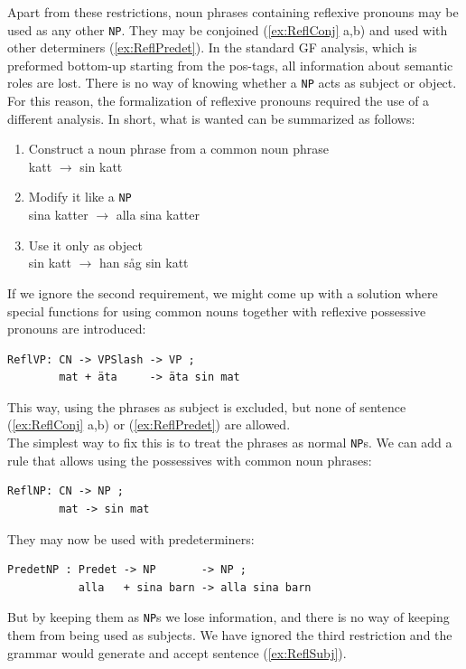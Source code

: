\documentclass{report}
\begin{document}
Apart from these restrictions, noun phrases containing reflexive pronouns
may be used as any other \verb-NP-. They may be conjoined 
(\ref{ex:ReflConj} a,b) and used with other determiners (\ref{ex:ReflPredet}).
In the standard GF analysis, which is preformed bottom-up starting from the pos-tags, 
all information about semantic roles are lost. There is no way
of knowing whether a \verb-NP- acts as subject or object. For this reason,
the formalization of reflexive pronouns required the use of a different analysis.
In short, what is wanted can be summarized as follows:\\
\begin{enumerate}
\item{
Construct a noun phrase from a common noun phrase \\
katt $\rightarrow$ sin katt} %
\item{Modify it like a \verb|NP|\\
sina katter $\rightarrow$ alla sina katter}
\item{Use it only as object\\
sin katt $\rightarrow$ han såg sin katt }
\end{enumerate}


If we ignore the second requirement, we might come up with a solution where
special functions for using common nouns
together with reflexive possessive pronouns are introduced:
\begin{verbatim}
ReflVP: CN -> VPSlash -> VP ;
        mat + äta     -> äta sin mat 
\end{verbatim}
This way, using the phrases as subject is excluded, but none of sentence
(\ref{ex:ReflConj} a,b) or (\ref{ex:ReflPredet}) are allowed.\\
The simplest way to fix this is to treat the phrases as normal \verb_NP_s.
We can add a rule that allows using the possessives with common noun phrases:
\begin{verbatim}
ReflNP: CN -> NP ;
        mat -> sin mat 
\end{verbatim}
They may now be used with predeterminers:
\begin{verbatim}
PredetNP : Predet -> NP       -> NP ;
           alla   + sina barn -> alla sina barn
\end{verbatim}
But by keeping them as \verb_NP_s we lose information, and there is no way of
keeping them from being used as subjects. We have ignored the third restriction
and the grammar would generate and accept sentence (\ref{ex:ReflSubj}).
\end{document}
